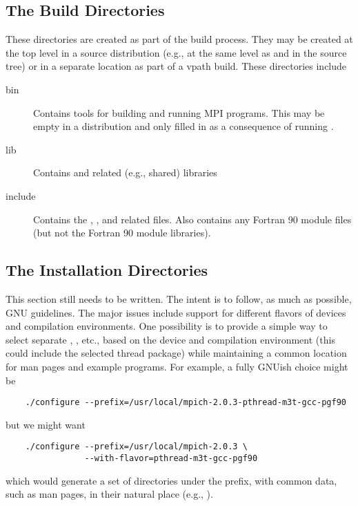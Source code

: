 \documentclass{article}
\begin{document}
\subsection{The Build Directories}
These directories are created as part of the build process.  They may
be created at the top level in a source distribution (e.g., at the
same level as  and  in the source tree) or in a
separate location as part of a vpath build.
These directories include
\begin{description}
\item[bin]Contains tools for building and running MPI programs.  This may be
  empty in a distribution and only filled in as a consequence of running
  .
\item[lib]Contains  and related (e.g., shared)
libraries
\item[include]Contains the , , and related
files.  Also contains any Fortran 90 module files (but not the Fortran
90 module libraries).
\end{description}

\subsection{The Installation Directories}
\label{sec:install-dirs}
This section still needs to be written.  The intent is to follow, as
much as possible, GNU guidelines.  The major issues include support
for different flavors of devices and compilation environments.  One
possibility is to provide a simple way to select separate
, , etc., based on the device and
compilation environment (this could include the selected thread
package) while maintaining a common location for man pages and example
programs.  For example, a fully GNUish choice might be
\begin{verbatim}
    ./configure --prefix=/usr/local/mpich-2.0.3-pthread-m3t-gcc-pgf90
\end{verbatim}
but we might want
\begin{verbatim}
    ./configure --prefix=/usr/local/mpich-2.0.3 \
                --with-flavor=pthread-m3t-gcc-pgf90
\end{verbatim}
which would generate a set of directories under the
 prefix, with common data, such as man
pages, in their natural place (e.g.,
).
\end{document}
